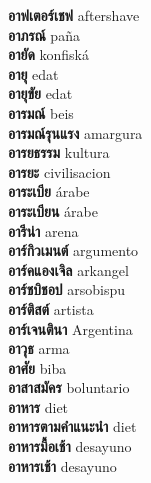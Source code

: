 \textbf{ อาฟเตอร์เชฟ  } aftershave \\
\textbf{ อาภรณ์  } paña \\
\textbf{ อายัด  } konfiská \\
\textbf{ อายุ  } edat \\
\textbf{ อายุขัย  } edat \\
\textbf{ อารมณ์  } beis \\
\textbf{ อารมณ์รุนแรง  } amargura \\
\textbf{ อารยธรรม  } kultura \\
\textbf{ อารยะ  } civilisacion \\
\textbf{ อาระเบีย  } árabe \\
\textbf{ อาระเบียน  } árabe \\
\textbf{ อารีน่า  } arena \\
\textbf{ อาร์กิวเมนต์  } argumento \\
\textbf{ อาร์คแองเจิล  } arkangel \\
\textbf{ อาร์ชบิชอป  } arsobispu \\
\textbf{ อาร์ติสต์  } artista \\
\textbf{ อาร์เจนตินา  } Argentina \\
\textbf{ อาวุธ  } arma \\
\textbf{ อาศัย  } biba \\
\textbf{ อาสาสมัคร  } boluntario \\
\textbf{ อาหาร  } diet \\
\textbf{ อาหารตามคำแนะนำ  } diet \\
\textbf{ อาหารมื้อเช้า  } desayuno \\
\textbf{ อาหารเช้า  } desayuno \\

